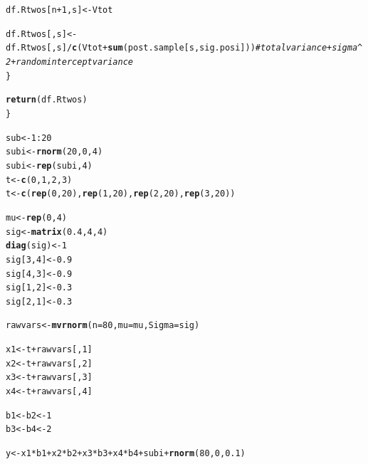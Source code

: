 \documentclass[11pt,a4paper,twoside]{book}\usepackage[]{graphicx}\usepackage[]{color}
\makeatletter
\newcommand{\hlnum}[1]{\textcolor[rgb]{0.686,0.059,0.569}{#1}}%
\newcommand{\hlcom}[1]{\textcolor[rgb]{0.678,0.584,0.686}{\textit{#1}}}%
\newcommand{\hlopt}[1]{\textcolor[rgb]{0,0,0}{#1}}%
\newcommand{\hlstd}[1]{\textcolor[rgb]{0.345,0.345,0.345}{#1}}%
\newcommand{\hlkwb}[1]{\textcolor[rgb]{0.69,0.353,0.396}{#1}}%
\newcommand{\hlkwc}[1]{\textcolor[rgb]{0.333,0.667,0.333}{#1}}%
\newcommand{\hlkwd}[1]{\textcolor[rgb]{0.737,0.353,0.396}{\textbf{#1}}}%
\newenvironment{kframe}{%
 \def\at@end@of@kframe{}%
 \ifinner\ifhmode%
  \def\at@end@of@kframe{\end{minipage}}%
  \begin{minipage}{\columnwidth}%
 \fi\fi%
 \def\FrameCommand##1{\hskip\@totalleftmargin \hskip-\fboxsep
 \colorbox{shadecolor}{##1}\hskip-\fboxsep
     \hskip-\linewidth \hskip-\@totalleftmargin \hskip\columnwidth}%
 \MakeFramed {\advance\hsize-\width
   \@totalleftmargin\z@ \linewidth\hsize
   \@setminipage}}%
 {\par\unskip\endMakeFramed%
 \at@end@of@kframe}
\newenvironment{knitrout}{}{} %
\makeatother
\begin{document}
\begin{knitrout}
\begin{kframe}
\begin{alltt}
                \hlstd{df.Rtwos[n}\hlopt{+}\hlnum{1}\hlstd{,s]} \hlkwb{<-} \hlstd{Vtot}

                \hlstd{df.Rtwos[,s]} \hlkwb{<-} \hlstd{df.Rtwos[,s]}\hlopt{/}\hlkwd{c}\hlstd{(Vtot} \hlopt{+} \hlkwd{sum}\hlstd{(post.sample[s,sig.posi] ))} \hlcom{#total variance + sigma^2 + random intercept variance}
        \hlstd{\}}

        \hlkwd{return}\hlstd{(df.Rtwos)}
\hlstd{\}}





\hlstd{sub}\hlkwb{<-} \hlnum{1}\hlopt{:}\hlnum{20}
\hlstd{subi} \hlkwb{<-} \hlkwd{rnorm}\hlstd{(}\hlnum{20}\hlstd{,} \hlnum{0}\hlstd{,} \hlnum{4}\hlstd{)}
\hlstd{subi}\hlkwb{<-}\hlkwd{rep}\hlstd{(subi,} \hlnum{4}\hlstd{)}
\hlstd{t} \hlkwb{<-} \hlkwd{c}\hlstd{(}\hlnum{0}\hlstd{,} \hlnum{1}\hlstd{,} \hlnum{2}\hlstd{,}\hlnum{3}\hlstd{)}
\hlstd{t} \hlkwb{<-} \hlkwd{c}\hlstd{(}\hlkwd{rep}\hlstd{(}\hlnum{0}\hlstd{,} \hlnum{20}\hlstd{),} \hlkwd{rep}\hlstd{(}\hlnum{1}\hlstd{,}\hlnum{20}\hlstd{),} \hlkwd{rep}\hlstd{(}\hlnum{2}\hlstd{,} \hlnum{20}\hlstd{),} \hlkwd{rep}\hlstd{(}\hlnum{3}\hlstd{,}\hlnum{20}\hlstd{))}

\hlstd{mu} \hlkwb{<-} \hlkwd{rep}\hlstd{(}\hlnum{0}\hlstd{,}\hlnum{4}\hlstd{)}
\hlstd{sig} \hlkwb{<-} \hlkwd{matrix}\hlstd{(}\hlnum{0.4}\hlstd{,} \hlnum{4}\hlstd{,} \hlnum{4}\hlstd{)}
\hlkwd{diag}\hlstd{(sig)} \hlkwb{<-} \hlnum{1}
\hlstd{sig[}\hlnum{3}\hlstd{,}\hlnum{4}\hlstd{]} \hlkwb{<-} \hlnum{0.9}
\hlstd{sig[}\hlnum{4}\hlstd{,}\hlnum{3}\hlstd{]} \hlkwb{<-} \hlnum{0.9}
\hlstd{sig[}\hlnum{1}\hlstd{,}\hlnum{2}\hlstd{]} \hlkwb{<-} \hlnum{0.3}
\hlstd{sig[}\hlnum{2}\hlstd{,}\hlnum{1}\hlstd{]} \hlkwb{<-} \hlnum{0.3}


\hlstd{rawvars} \hlkwb{<-} \hlkwd{mvrnorm}\hlstd{(}\hlkwc{n}\hlstd{=}\hlnum{80}\hlstd{,} \hlkwc{mu}\hlstd{=mu,} \hlkwc{Sigma}\hlstd{=sig)}

\hlstd{x1} \hlkwb{<-} \hlstd{t}\hlopt{+}\hlstd{rawvars[,}\hlnum{1}\hlstd{]}
\hlstd{x2} \hlkwb{<-} \hlstd{t}\hlopt{+}\hlstd{rawvars[,}\hlnum{2}\hlstd{]}
\hlstd{x3} \hlkwb{<-} \hlstd{t}\hlopt{+}\hlstd{rawvars[,}\hlnum{3}\hlstd{]}
\hlstd{x4} \hlkwb{<-} \hlstd{t}\hlopt{+}\hlstd{rawvars[,}\hlnum{4}\hlstd{]}

\hlstd{b1} \hlkwb{<-} \hlstd{b2}  \hlkwb{<-}\hlnum{1}
\hlstd{b3} \hlkwb{<-} \hlstd{b4} \hlkwb{<-} \hlnum{2}

\hlstd{y}\hlkwb{<-} \hlstd{x1}\hlopt{*}\hlstd{b1} \hlopt{+}\hlstd{x2}\hlopt{*}\hlstd{b2} \hlopt{+}\hlstd{x3}\hlopt{*}\hlstd{b3}\hlopt{+}  \hlstd{x4}\hlopt{*}\hlstd{b4} \hlopt{+} \hlstd{subi}\hlopt{+} \hlkwd{rnorm}\hlstd{(}\hlnum{80}\hlstd{,} \hlnum{0}\hlstd{,} \hlnum{0.1}\hlstd{)}


\end{alltt}
\end{kframe}
\end{knitrout}
\end{document}
